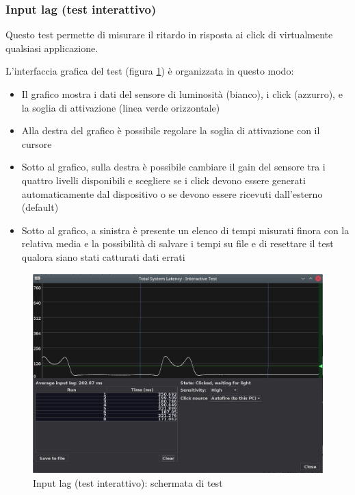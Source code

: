\subsubsection{Input lag (test interattivo)}
Questo test permette di misurare il ritardo in risposta ai click di virtualmente qualsiasi applicazione.

L'interfaccia grafica del test (figura \ref{fig:gui_interactiveinputlag_results}) è organizzata in questo modo:\begin{itemize}
	\item Il grafico mostra i dati del sensore di luminosità (bianco), i click (azzurro), e la soglia di attivazione (linea verde orizzontale)
	\item Alla destra del grafico è possibile regolare la soglia di attivazione con il cursore
	\item Sotto al grafico, sulla destra è possibile cambiare il gain del sensore tra i quattro livelli disponibili e scegliere se i click devono essere generati automaticamente dal dispositivo o se devono essere ricevuti dall'esterno (default)
	\item Sotto al grafico, a sinistra è presente un elenco di tempi misurati finora con la relativa media e la possibilità di salvare i tempi su file e di resettare il test qualora siano stati catturati dati errati
\end{itemize}

\begin{figure}[H]
	\centering
	\includegraphics[width=\textwidth]{Applicazione_files/gui_interactiveinputlag_results.png}
	\caption{Input lag (test interattivo): schermata di test}
	\label{fig:gui_interactiveinputlag_results}
\end{figure}

